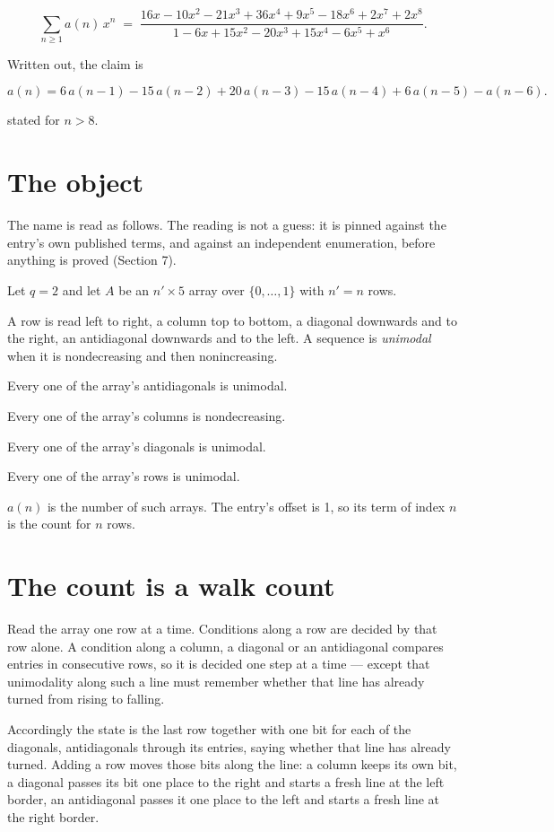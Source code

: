 \documentclass[11pt]{article}
\theoremstyle{definition}
\begin{document}
\[\sum_{n \ge 1} a(n)\,x^n \;=\; \frac{16x - 10x^{2} - 21x^{3} + 36x^{4} + 9x^{5} - 18x^{6} + 2x^{7} + 2x^{8}}{1 - 6x + 15x^{2} - 20x^{3} + 15x^{4} - 6x^{5} + x^{6}}.\]

Written out, the claim is

\[a(n) = 6\,a(n-1) - 15\,a(n-2) + 20\,a(n-3) - 15\,a(n-4) + 6\,a(n-5) - a(n-6).\]

stated for $n > 8$.

\section{The object}

The name is read as follows. The reading is not a guess: it is pinned against the entry's own published terms, and against an independent enumeration, before anything is proved (Section 7).

Let $q = 2$ and let $A$ be an $n' \times 5$ array over $\{0,\dots,1\}$ with $n' = n$ rows.

A row is read left to right, a column top to bottom, a diagonal downwards and to the right, an antidiagonal downwards and to the left. A sequence is {\itshape unimodal} when it is nondecreasing and then nonincreasing.

Every one of the array's antidiagonals is unimodal.

Every one of the array's columns is nondecreasing.

Every one of the array's diagonals is unimodal.

Every one of the array's rows is unimodal.

$a(n)$ is the number of such arrays. The entry's offset is 1, so its term of index $n$ is the count for $n$ rows.

\section{The count is a walk count}

Read the array one row at a time. Conditions along a row are decided by that row alone. A condition along a column, a diagonal or an antidiagonal compares entries in consecutive rows, so it is decided one step at a time --- except that unimodality along such a line must remember whether that line has already turned from rising to falling.

Accordingly the state is the last row together with one bit for each of the diagonals, antidiagonals through its entries, saying whether that line has already turned. Adding a row moves those bits along the line: a column keeps its own bit, a diagonal passes its bit one place to the right and starts a fresh line at the left border, an antidiagonal passes it one place to the left and starts a fresh line at the right border.
\end{document}
